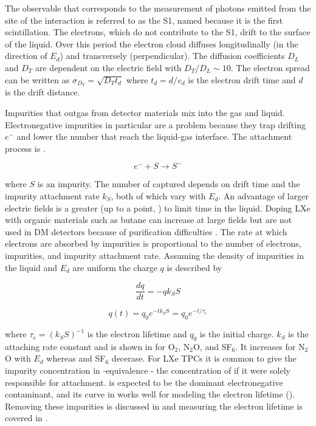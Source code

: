 The observable that corresponds to the measurement of photons emitted from the site of the interaction is referred to as the S1, named
because it is the first scintillation.  The electrons, which do not contribute to the S1, drift to the surface of the liquid.  Over this
period the electron cloud diffuses longitudinally (in the direction of $E_{d}$) and transversely (perpendicular).  The
diffusion coefficients $D_{L}$ and $D_{T}$ are dependent on the electric field with $D_{T}/D_{L} \sim 10$.  The electron spread can
be written as $\sigma_{D_{T}} = \sqrt{D_{T} t_{d}}$ where $t_{d} = d/v_{d}$ is the electron drift time and $d$ is the drift distance.

Impurities that outgas from detector materials mix into the gas and liquid.  Electronegative impurities in particular are a problem
because they trap drifting $e^{-}$ and
lower the number that reach the liquid-gas interface.  The attachment process
is .

\begin{equation}
e^{-} + S \rightarrow S^{-}
\label{eq:impurity_attach}
\end{equation}

\noindent where $S$ is an impurity.  The number of \electron captured depends on drift time and the impurity attachment rate
$k_{S}$, both of which vary with $E_{d}$.  An advantage of larger electric fields is a greater
\vd (up to a point, ) to limit time in the liquid.  Doping LXe with organic materials such as butane
can increase \vd at large
fields but are not used in DM detectors because of purification difficulties .  The rate at which electrons are
absorbed by impurities is proportional to the number of electrons, impurities, and impurity attachment rate.  Assuming the density
of impurities in the liquid and $E_{d}$ are uniform the charge $q$ is described by

\begin{equation}
\frac{dq}{dt} = -qk_{S}S
\label{eq:lifetime_diff_eq}
\end{equation}

\begin{equation}
q(t) = q_{0}e^{-tk_{S}S} = q_{0}e^{-t/\tau_{e}}
\label{eq:lifetime_equation}
\end{equation}

\noindent where $\tau_{e} = (k_{S}S)^{-1}$ is the electron lifetime and $q_0$ is the initial charge.  $k_{S}$ is the attaching rate
constant and is shown in  for O$_{2}$,
N$_{2}$O, and SF$_{6}$.  It increases for N$_{2}$O with $E_d$ whereas \otwo and SF$_{6}$
decerase.  For LXe TPCs it is common to give the impurity concentration in -equivalence - the concentration of \otwo if it were
solely responsible for \electron attachment.   is expected to be the dominant electronegative contaminant, and its curve
in  works well for modeling the electron lifetime ().  Removing these
impurities is discussed in  and measuring the electron lifetime is covered in
.

